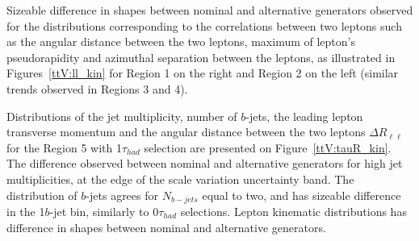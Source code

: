 Sizeable difference in shapes between nominal and alternative generators observed for the distributions corresponding to the correlations between two leptons such as the angular distance between the two leptons, maximum of lepton's pseudorapidity and azimuthal separation between the leptons, as illustrated in Figures~\ref{ttV:ll_kin} for Region 1 on the right and Region 2 on the left (similar trends observed in Regions 3 and 4).

Distributions of the jet multiplicity, number of $b$-jets, the leading lepton transverse momentum and the angular distance between the two leptons  $\Delta R _{\ell \ell }$ for the Region 5 with 1$\tau_{had}$ selection are presented on Figure~\ref{ttV:tauR_kin}.
The difference observed between nominal and alternative generators for high jet multiplicities, at the edge of the scale variation uncertainty band. 
The distribution of $b$-jets agrees for $N_{b-jets}$ equal to two, and has sizeable difference in the 1$b$-jet bin, similarly to 0$\tau_{had}$ selections.
Lepton kinematic distributions has difference in shapes between nominal and alternative generators.

